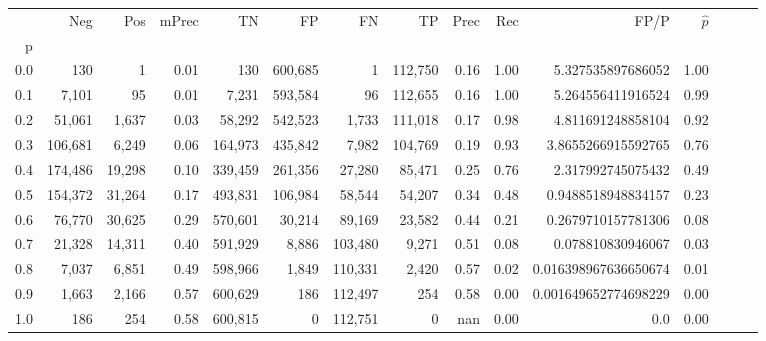 \begin{tabular}{rrrrrrrrrrrrrrr}
\toprule
{} &      Neg &     Pos & mPrec &       TN &       FP &       FN &       TP &  Prec &   Rec &                  FP/P & $\hat{p}$ \\
p   &          &         &       &          &          &          &          &       &       &                       &           \\
\midrule
0.0 &      130 &       1 &  0.01 &      130 &  600,685 &        1 &  112,750 &  0.16 &  1.00 &     5.327535897686052 &      1.00 \\
0.1 &    7,101 &      95 &  0.01 &    7,231 &  593,584 &       96 &  112,655 &  0.16 &  1.00 &     5.264556411916524 &      0.99 \\
0.2 &   51,061 &   1,637 &  0.03 &   58,292 &  542,523 &    1,733 &  111,018 &  0.17 &  0.98 &     4.811691248858104 &      0.92 \\
0.3 &  106,681 &   6,249 &  0.06 &  164,973 &  435,842 &    7,982 &  104,769 &  0.19 &  0.93 &    3.8655266915592765 &      0.76 \\
0.4 &  174,486 &  19,298 &  0.10 &  339,459 &  261,356 &   27,280 &   85,471 &  0.25 &  0.76 &     2.317992745075432 &      0.49 \\
0.5 &  154,372 &  31,264 &  0.17 &  493,831 &  106,984 &   58,544 &   54,207 &  0.34 &  0.48 &    0.9488518948834157 &      0.23 \\
0.6 &   76,770 &  30,625 &  0.29 &  570,601 &   30,214 &   89,169 &   23,582 &  0.44 &  0.21 &    0.2679710157781306 &      0.08 \\
0.7 &   21,328 &  14,311 &  0.40 &  591,929 &    8,886 &  103,480 &    9,271 &  0.51 &  0.08 &     0.078810830946067 &      0.03 \\
0.8 &    7,037 &   6,851 &  0.49 &  598,966 &    1,849 &  110,331 &    2,420 &  0.57 &  0.02 &  0.016398967636650674 &      0.01 \\
0.9 &    1,663 &   2,166 &  0.57 &  600,629 &      186 &  112,497 &      254 &  0.58 &  0.00 &  0.001649652774698229 &      0.00 \\
1.0 &      186 &     254 &  0.58 &  600,815 &        0 &  112,751 &        0 &   nan &  0.00 &                   0.0 &      0.00 \\
\bottomrule
\end{tabular}
